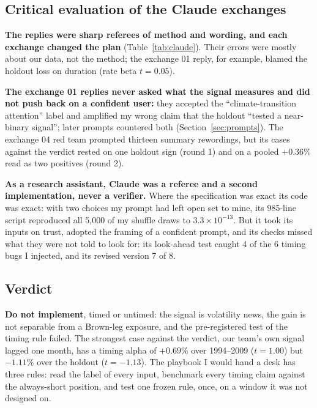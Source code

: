 \subsection{Critical evaluation of the Claude exchanges}
\label{sec:claude}

\textbf{The replies were sharp referees of method and wording, and each exchange changed the plan} (Table~\ref{tab:claude}). Their errors were mostly about our data, not the method; the exchange 01 reply, for example, blamed the holdout loss on duration (rate beta $t=0.05$).

\textbf{The exchange 01 replies never asked what the signal measures and did not push back on a confident user:} they accepted the ``climate-transition attention'' label and amplified my wrong claim that the holdout ``tested a near-binary signal''; later prompts countered both (Section~\ref{sec:prompts}). The exchange 04 red team prompted thirteen summary rewordings, but its cases against the verdict rested on one holdout sign (round 1) and on a pooled $+0.36$\% read as two positives (round 2).

\textbf{As a research assistant, Claude was a referee and a second implementation, never a verifier.} Where the specification was exact its code was exact: with two choices my prompt had left open set to mine, its 985-line script reproduced all 5,000 of my shuffle draws to $3.3\times10^{-13}$. But it took its inputs on trust, adopted the framing of a confident prompt, and its checks missed what they were not told to look for: its look-ahead test caught 4 of the 6 timing bugs I injected, and its revised version 7 of 8.

\subsection{Verdict}
\label{sec:verdict}

\textbf{Do not implement}, timed or untimed: the signal is volatility news, the gain is not separable from a Brown-leg exposure, and the pre-registered test of the timing rule failed. The strongest case against the verdict, our team's own signal lagged one month, has a timing alpha of $+0.69$\% over 1994--2009 ($t=1.00$) but $-1.11$\% over the holdout ($t=-1.13$). The playbook I would hand a desk has three rules: read the label of every input, benchmark every timing claim against the always-short position, and test one frozen rule, once, on a window it was not designed on.

